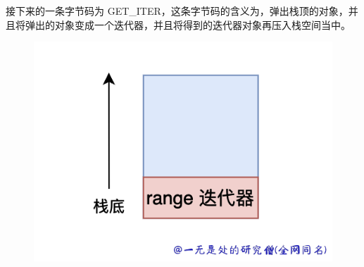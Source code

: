 接下来的一条字节码为 GET\_ITER，这条字节码的含义为，弹出栈顶的对象，并且将弹出的对象变成一个迭代器，并且将得到的迭代器对象再压入栈空间当中。

    \begin{figure}[H]
        \centering
            \includegraphics[scale=.25]{images/67-bytecode.png}
						\caption{ }
        \label{fig:my_label}
    \end{figure}
    

